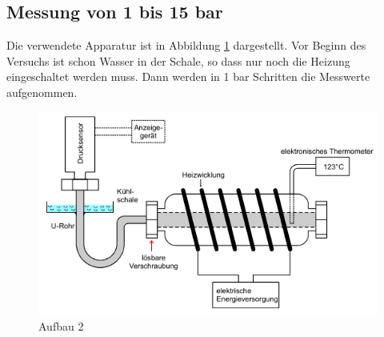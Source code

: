\subsection{Messung von 1 bis 15 bar}
Die verwendete Apparatur ist in Abbildung \ref{fig:aufbau2} dargestellt. Vor Beginn des Versuchs ist schon Wasser in der Schale, so dass nur noch die Heizung eingeschaltet
werden muss. Dann werden in 1 bar Schritten die Messwerte aufgenommen.
\begin{figure}
  \centering
  \includegraphics{Aufbau2.png}
  \caption{Aufbau 2 \cite{sample}}
  \label{fig:aufbau2}
\end{figure}